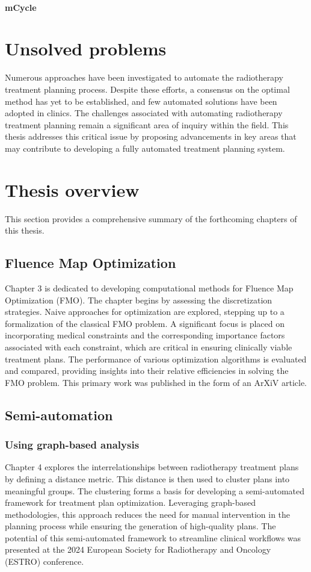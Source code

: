 \paragraph{mCycle}

\section{Unsolved problems}
Numerous approaches have been investigated to automate the radiotherapy treatment planning process.
Despite these efforts, a consensus on the optimal method has yet to be established, and few automated solutions have been adopted in clinics.
The challenges associated with automating radiotherapy treatment planning remain a significant area of inquiry within the field.
This thesis addresses this critical issue by proposing advancements in key areas that may contribute to developing a fully automated treatment planning system.

\section{Thesis overview}
This section provides a comprehensive summary of the forthcoming chapters of this thesis.

\subsection{Fluence Map Optimization}
Chapter 3 is dedicated to developing computational methods for Fluence Map Optimization (FMO).
The chapter begins by assessing the discretization strategies.
Naive approaches for optimization are explored, stepping up to a formalization of the classical FMO problem.
A significant focus is placed on incorporating medical constraints and the corresponding importance factors associated with each constraint, which are critical in ensuring clinically viable treatment plans.
The performance of various optimization algorithms is evaluated and compared, providing insights into their relative efficiencies in solving the FMO problem.
This primary work was published in the form of an ArXiV article.

\subsection{Semi-automation}
\subsubsection*{Using graph-based analysis}
Chapter 4 explores the interrelationships between radiotherapy treatment plans by defining a distance metric.
This distance is then used to cluster plans into meaningful groups.
The clustering forms a basis for developing a semi-automated framework for treatment plan optimization.
Leveraging graph-based methodologies, this approach reduces the need for manual intervention in the planning process while ensuring the generation of high-quality plans.
The potential of this semi-automated framework to streamline clinical workflows was presented at the 2024 European Society for Radiotherapy and Oncology (ESTRO) conference.

